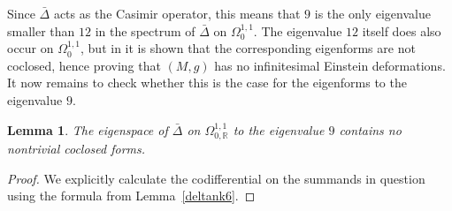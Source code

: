 \documentclass[12pt]{scrartcl}
\theoremstyle{plain}
\newtheorem{lem}[satz]{Lemma}
\theoremstyle{definition}
\newcommand{\R}{\mathbb{R}}%
\begin{document}
Since $\bar\Delta$ acts as the Casimir operator, this means that $9$ is the only eigenvalue smaller than $12$ in the spectrum of $\bar\Delta$ on $\Omega^{1,1}_0$. The eigenvalue $12$ itself does also occur on $\Omega^{1,1}_0$, but in \cite{hermitianlaplace} it is shown that the corresponding eigenforms are not coclosed, hence proving that $(M,g)$ has no infinitesimal Einstein deformations. It now remains to check whether this is the case for the eigenforms to the eigenvalue $9$.

\begin{lem}\label{9coclosed}
 The eigenspace of $\bar\Delta$ on $\Omega^{1,1}_{0,\R}$ to the eigenvalue $9$ contains no nontrivial coclosed forms.
\end{lem}
\begin{proof}
We explicitly calculate the codifferential on the summands in question using the formula from Lemma~\ref{deltank6}.


\end{proof}
\end{document}
